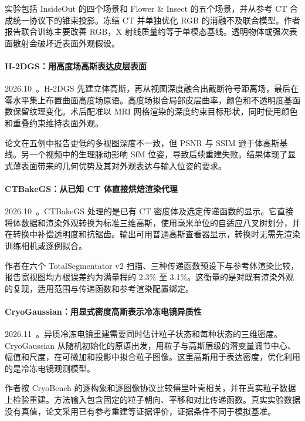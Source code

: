 实验包括 InsideOut 的四个场景和 Flower \& Insect 的五个场景，并从参考 CT 合成统一协议下的锥束投影。冻结 CT 并单独优化 RGB 的消融不及联合模型。作者报告联合训练主要改善 RGB，X 射线质量约等于单模态基线。透明物体或强次表面散射会破坏近表面外观假设。

\paragraph{H-2DGS：用高度场高斯表达皮层表面}
2026.10~\cite{2610_30910}。H-2DGS 先建立体高斯，再从视图深度融合出截断符号距离场，最后在零水平集上布置曲面高度场原语。高度场拟合局部皮层曲率，颜色和不透明度基函数保留纹理变化。术后配准以 MRI 网格渲染的深度约束目标形状，同时使用颜色和重叠约束维持表面外观。

论文在五例中报告更低的多视图深度不一致，但 PSNR 与 SSIM 逊于体高斯基线。另一个视频中的生理脉动影响 SfM 位姿，导致后续重建失败。结果体现了显式薄表面带来的几何优势及其对外观表达与输入位姿的要求。

\paragraph{CTBakeGS：从已知 CT 体直接烘焙渲染代理}
2026.10~\cite{2610_37406}。CTBakeGS 处理的是已有 CT 密度体及选定传递函数的显示。它直接将体数据和渲染外观转换为标准三维高斯，使用毫米单位的自适应八叉树划分，并在转换中补偿透明度和抗锯齿。输出可用普通高斯查看器显示，转换时无需先渲染训练相机或逐例拟合。

作者在六个 TotalSegmentator v2 扫描、三种传递函数预设下与参考体渲染比较，报告宽视图均方根误差约为满量程的 2.3\% 至 3.1\%。这衡量的是对既有渲染外观的复现，适用范围与传递函数和参考渲染配置绑定。

\paragraph{CryoGaussian：用显式密度高斯表示冷冻电镜异质性}
2026.11~\cite{2611_26128}。异质冷冻电镜重建需要同时估计粒子状态和每种状态的三维密度。CryoGaussian 从随机初始化的原语出发，用粒子与高斯层级的潜变量调节中心、幅值和尺度，在可微加和投影中拟合粒子图像。这里高斯用于表达密度，优化利用的是冷冻电镜观测模型。

作者按 CryoBench 的逐构象和逐图像协议比较傅里叶壳相关，并在真实粒子数据上检验重建。方法输入包含固定的粒子朝向、平移和对比传递函数。真实实验数据没有真值，论文采用已有参考重建等证据评价，证据条件不同于模拟基准。

